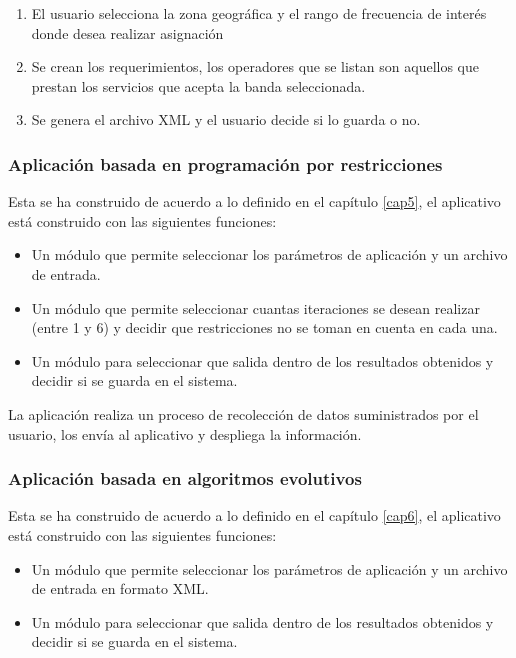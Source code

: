 \begin{enumerate}
	\item El usuario selecciona la zona geográfica y el rango de frecuencia de interés donde desea realizar asignación
	\item Se crean los requerimientos, los operadores que se listan son aquellos que prestan los servicios que acepta la banda seleccionada.
	\item Se genera el archivo XML y el usuario decide si lo guarda o no.
\end{enumerate}

\subsubsection{Aplicación basada en programación por restricciones}

Esta se ha construido de acuerdo a lo definido en el capítulo \ref{cap5}, el aplicativo está construido con las siguientes funciones:

\begin{itemize}
	\item Un módulo que permite seleccionar los parámetros de aplicación y un archivo de entrada.
	\item Un módulo que permite seleccionar cuantas iteraciones se desean realizar (entre 1 y 6) y decidir que restricciones no se toman en cuenta en cada una.
	\item Un módulo para seleccionar que salida dentro de los resultados obtenidos y decidir si se guarda en el sistema.
\end{itemize}

La aplicación realiza un proceso de recolección de datos suministrados por el usuario, los envía al aplicativo y despliega la información.

\subsubsection{Aplicación basada en algoritmos evolutivos}

Esta se ha construido de acuerdo a lo definido en el capítulo \ref{cap6}, el aplicativo está construido con las siguientes funciones:

\begin{itemize}
	\item Un módulo que permite seleccionar los parámetros de aplicación y un archivo de entrada en formato XML.
	\item Un módulo para seleccionar que salida dentro de los resultados obtenidos y decidir si se guarda en el sistema.
\end{itemize}


